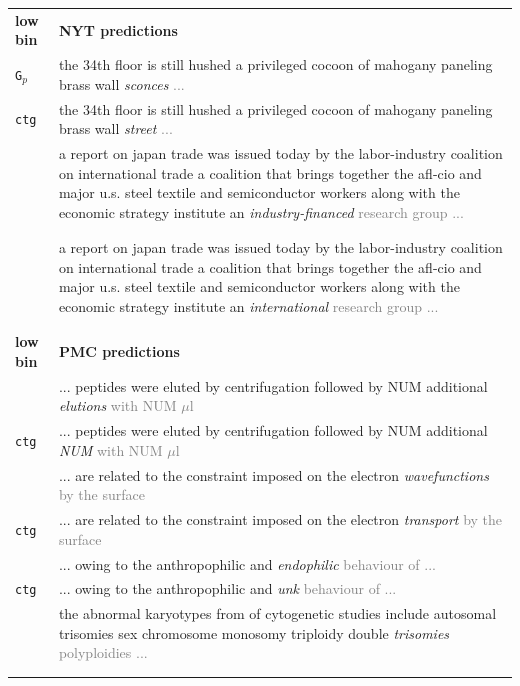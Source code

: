 \documentclass[11pt,a4paper]{article}
\begin{document}
\begin{table}[t]
    \centering
\begin{tabularx}{\linewidth}{ll} 
\textbf{low bin} & \textbf{NYT predictions}  \\ 
    \addlinespace[1ex]

    {\tt G$_{p}$} & the 34th floor is still hushed a privileged cocoon of mahogany paneling brass wall \textit{sconces} \textcolor{gray}{...} \\
    {\tt ctg} & the 34th floor is still hushed a privileged cocoon of mahogany paneling brass wall \textit{street} \textcolor{gray}{...}\\
    \addlinespace[1ex]
    {\tt G} & \multirow{1}{*}{\parbox{13cm}{a report on japan trade was issued today by the labor-industry coalition on international trade a coalition that brings together the afl-cio and major u.s. steel textile and semiconductor workers along with the economic strategy institute an \textit{industry-financed} \textcolor{gray}{research group ...}}} \\ \\ \\
    \addlinespace[1ex]
     {\tt ctg} & \multirow{1}{*}{\parbox{13cm}{a report on japan trade was issued today by the labor-industry coalition on international trade a coalition that brings together the afl-cio and major u.s. steel textile and semiconductor workers along with the economic strategy institute an \textit{international} \textcolor{gray}{research group ...}}} \\ \\ \\
    \addlinespace[1ex]
\textbf{low bin} & \textbf{PMC predictions}  \\ 
    \addlinespace[1ex]
    {\tt G} & ... peptides were eluted by centrifugation followed by NUM additional \textit{elutions} \textcolor{gray}{with NUM $\mu$l} \\
    {\tt ctg} & ... peptides were eluted by centrifugation followed by NUM additional \textit{NUM} \textcolor{gray}{with NUM $\mu$l} \\
    \addlinespace[1ex]
    {\tt G$_{p}$} & ... are related to the constraint imposed on the electron \textit{wavefunctions} \textcolor{gray}{by the surface} \\
    {\tt ctg} & ... are related to the constraint imposed on the electron \textit{transport} \textcolor{gray}{by the surface} \\
    \addlinespace[1ex]
    {\tt G} &  ... owing to the anthropophilic and \textit{endophilic} \textcolor{gray}{behaviour of ...}\\
    {\tt ctg} & ... owing to the anthropophilic and \textit{unk} \textcolor{gray}{behaviour of ...}\\
    \addlinespace[1ex]
    {\tt G$_{p}$} & \multirow{1}{*}{\parbox{13cm}{the abnormal karyotypes from of cytogenetic studies include autosomal trisomies sex chromosome monosomy triploidy double \textit{trisomies} \textcolor{gray}{polyploidies ...}}}
     \\ \\
    \addlinespace[1ex]


\end{tabularx}
\end{table}
\end{document}
